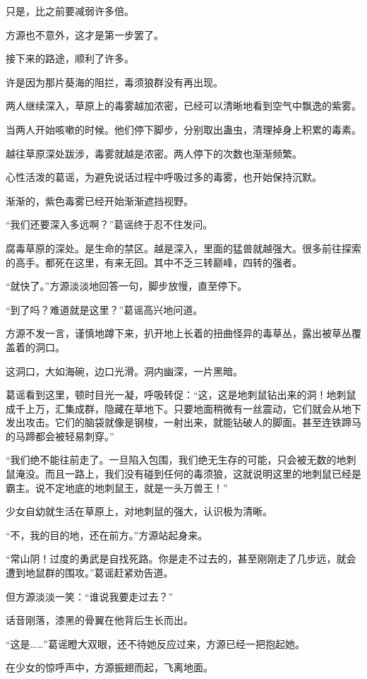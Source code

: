 \begin{this_body}
只是，比之前要减弱许多倍。

方源也不意外，这才是第一步罢了。

接下来的路途，顺利了许多。

许是因为那片葵海的阻拦，毒须狼群没有再出现。

两人继续深入，草原上的毒雾越加浓密，已经可以清晰地看到空气中飘逸的紫雾。

当两人开始咳嗽的时候。他们停下脚步，分别取出蛊虫，清理掉身上积累的毒素。

越往草原深处跋涉，毒雾就越是浓密。两人停下的次数也渐渐频繁。

心性活泼的葛谣，为避免说话过程中呼吸过多的毒雾，也开始保持沉默。

渐渐的，紫色毒雾已经开始渐渐遮挡视野。

“我们还要深入多远啊？”葛谣终于忍不住发问。

腐毒草原的深处。是生命的禁区。越是深入，里面的猛兽就越强大。很多前往探索的高手。都死在这里，有来无回。其中不乏三转巅峰，四转的强者。

“就快了。”方源淡淡地回答一句，脚步放慢，直至停下。

“到了吗？难道就是这里？”葛谣高兴地问道。

方源不发一言，谨慎地蹲下来，扒开地上长着的扭曲怪异的毒草丛，露出被草丛覆盖着的洞口。

这洞口，大如海碗，边口光滑。洞内幽深，一片黑暗。

葛谣看到这里，顿时目光一凝，呼吸转促：“这，这是地刺鼠钻出来的洞！地刺鼠成千上万，汇集成群，隐藏在草地下。只要地面稍微有一丝震动，它们就会从地下发出攻击。它们的脑袋就像是钢梭，一射出来，就能钻破人的脚面。甚至连铁蹄马的马蹄都会被轻易刺穿。”

“我们绝不能往前走了。一旦陷入包围，我们绝无生存的可能，只会被无数的地刺鼠淹没。而且一路上，我们没有碰到任何的毒须狼，这就说明这里的地刺鼠已经是霸主。说不定地底的地刺鼠王，就是一头万兽王！”

少女自幼就生活在草原上，对地刺鼠的强大，认识极为清晰。

“不，我的目的地，还在前方。”方源站起身来。

“常山阴！过度的勇武是自找死路。你是走不过去的，甚至刚刚走了几步远，就会遭到地鼠群的围攻。”葛谣赶紧劝告道。

但方源淡淡一笑：“谁说我要走过去？”

话音刚落，漆黑的骨翼在他背后生长而出。

“这是……”葛谣瞪大双眼，还不待她反应过来，方源已经一把抱起她。

在少女的惊呼声中，方源振翅而起，飞离地面。


\end{this_body}
